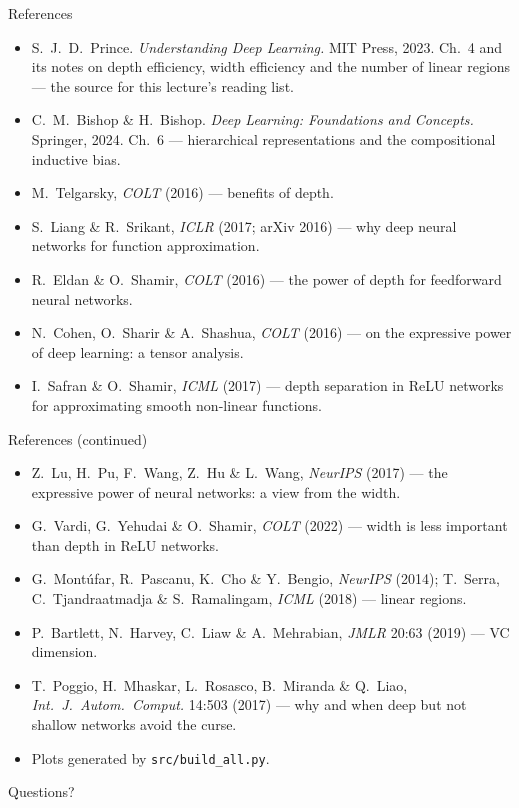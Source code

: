 \documentclass[aspectratio=169, 11pt]{beamer}
\newcommand{\nosrc}{}       %
\begin{document}
\begin{frame}{References}
  \nosrc
  \scriptsize
  \begin{itemize}\setlength{\itemsep}{1pt}
    \item S.~J.~D.~Prince. \textit{Understanding Deep Learning.}
          MIT Press, 2023. Ch.~4 and its notes on depth efficiency,
          width efficiency and the number of linear regions --- the
          source for this lecture's reading list.
    \item C.~M.~Bishop \& H.~Bishop. \textit{Deep Learning: Foundations
          and Concepts.} Springer, 2024. Ch.~6 --- hierarchical
          representations and the compositional inductive bias.
    \item M.~Telgarsky, \textit{COLT} (2016) --- benefits of depth.
    \item S.~Liang \& R.~Srikant, \textit{ICLR} (2017; arXiv 2016) ---
          why deep neural networks for function approximation.
    \item R.~Eldan \& O.~Shamir, \textit{COLT} (2016) --- the power of
          depth for feedforward neural networks.
    \item N.~Cohen, O.~Sharir \& A.~Shashua, \textit{COLT} (2016) ---
          on the expressive power of deep learning: a tensor analysis.
    \item I.~Safran \& O.~Shamir, \textit{ICML} (2017) --- depth
          separation in ReLU networks for approximating smooth
          non-linear functions.
  \end{itemize}
\end{frame}

\begin{frame}{References (continued)}
  \nosrc
  \scriptsize
  \begin{itemize}\setlength{\itemsep}{1pt}
    \item Z.~Lu, H.~Pu, F.~Wang, Z.~Hu \& L.~Wang, \textit{NeurIPS}
          (2017) --- the expressive power of neural networks: a view
          from the width.
    \item G.~Vardi, G.~Yehudai \& O.~Shamir, \textit{COLT} (2022) ---
          width is less important than depth in ReLU networks.
    \item G.~Mont\'ufar, R.~Pascanu, K.~Cho \& Y.~Bengio,
          \textit{NeurIPS} (2014); T.~Serra, C.~Tjandraatmadja \&
          S.~Ramalingam, \textit{ICML} (2018) --- linear regions.
    \item P.~Bartlett, N.~Harvey, C.~Liaw \& A.~Mehrabian,
          \textit{JMLR} 20:63 (2019) --- VC dimension.
    \item T.~Poggio, H.~Mhaskar, L.~Rosasco, B.~Miranda \& Q.~Liao,
          \textit{Int.\ J.\ Autom.\ Comput.} 14:503 (2017) --- why and
          when deep but not shallow networks avoid the curse.
    \item Plots generated by \texttt{src/build\_all.py}.
  \end{itemize}
\end{frame}

\begin{frame}[standout]
  \nosrc
  Questions?
\end{frame}
\end{document}
